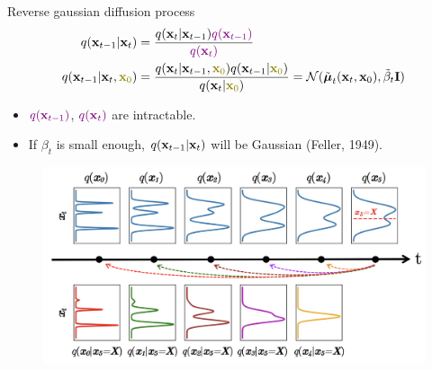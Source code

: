 \begin{frame}{Reverse gaussian diffusion process}
		\vspace{-0.4cm}
		\begin{align*}
			q(\bx_{t-1}|\bx_{t}) &= \frac{q(\bx_{t}|\bx_{t-1}) {\color{violet}q(\bx_{t-1})}}{{\color{violet}q(\bx_{t})}} \\
			q(\bx_{t-1}|\bx_{t}, {\color{olive}\bx_0}) &= \frac{q(\bx_{t}|\bx_{t-1}, {\color{olive}\bx_0}) q(\bx_{t-1} | {\color{olive}\bx_0}) }{q(\bx_{t}| {\color{olive}\bx_0})} = \cN(\tilde{\bmu}_t(\bx_t, \bx_0), \tilde{\beta}_t \bI)
		\end{align*}
		\vspace{-0.2cm}
		\begin{itemize}
			\item ${\color{violet}q(\mathbf{x}_{t-1})}$, ${\color{violet}q(\mathbf{x}_{t})}$ are intractable.
			\item If $\beta_t$ is small enough, $q(\mathbf{x}_{t-1}|\mathbf{x}_{t})$ will be Gaussian (Feller, 1949).
		\end{itemize}
	\vspace{-0.2cm}
	\begin{figure}
		\includegraphics[width=0.7\linewidth]{figs/inverse_distr_1d}
	\end{figure}
	\end{frame} 
